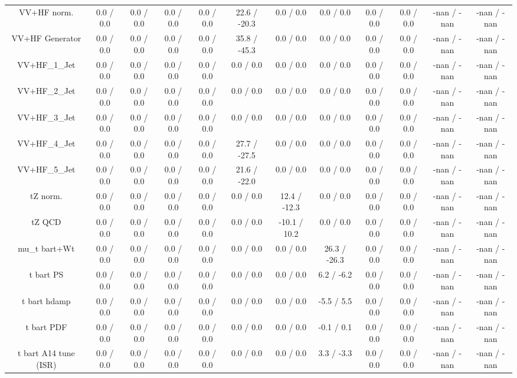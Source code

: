 \begin{table}[htbp]
\begin{center}
\begin{tabular}{|c|c|c|c|c|c|c|c|c|c|c|c|}
  VV+HF norm. & 0.0 / 0.0 & 0.0 / 0.0 & 0.0 / 0.0 & 0.0 / 0.0 & 22.6 / -20.3 & 0.0 / 0.0 & 0.0 / 0.0 & 0.0 / 0.0 & 0.0 / 0.0 & -nan / -nan & -nan / -nan \\ 
  VV+HF Generator & 0.0 / 0.0 & 0.0 / 0.0 & 0.0 / 0.0 & 0.0 / 0.0 & 35.8 / -45.3 & 0.0 / 0.0 & 0.0 / 0.0 & 0.0 / 0.0 & 0.0 / 0.0 & -nan / -nan & -nan / -nan \\ 
  VV+HF_1_Jet & 0.0 / 0.0 & 0.0 / 0.0 & 0.0 / 0.0 & 0.0 / 0.0 & 0.0 / 0.0 & 0.0 / 0.0 & 0.0 / 0.0 & 0.0 / 0.0 & 0.0 / 0.0 & -nan / -nan & -nan / -nan \\ 
  VV+HF_2_Jet & 0.0 / 0.0 & 0.0 / 0.0 & 0.0 / 0.0 & 0.0 / 0.0 & 0.0 / 0.0 & 0.0 / 0.0 & 0.0 / 0.0 & 0.0 / 0.0 & 0.0 / 0.0 & -nan / -nan & -nan / -nan \\ 
  VV+HF_3_Jet & 0.0 / 0.0 & 0.0 / 0.0 & 0.0 / 0.0 & 0.0 / 0.0 & 0.0 / 0.0 & 0.0 / 0.0 & 0.0 / 0.0 & 0.0 / 0.0 & 0.0 / 0.0 & -nan / -nan & -nan / -nan \\ 
  VV+HF_4_Jet & 0.0 / 0.0 & 0.0 / 0.0 & 0.0 / 0.0 & 0.0 / 0.0 & 27.7 / -27.5 & 0.0 / 0.0 & 0.0 / 0.0 & 0.0 / 0.0 & 0.0 / 0.0 & -nan / -nan & -nan / -nan \\ 
  VV+HF_5_Jet & 0.0 / 0.0 & 0.0 / 0.0 & 0.0 / 0.0 & 0.0 / 0.0 & 21.6 / -22.0 & 0.0 / 0.0 & 0.0 / 0.0 & 0.0 / 0.0 & 0.0 / 0.0 & -nan / -nan & -nan / -nan \\ 
  tZ norm. & 0.0 / 0.0 & 0.0 / 0.0 & 0.0 / 0.0 & 0.0 / 0.0 & 0.0 / 0.0 & 12.4 / -12.3 & 0.0 / 0.0 & 0.0 / 0.0 & 0.0 / 0.0 & -nan / -nan & -nan / -nan \\ 
  tZ QCD & 0.0 / 0.0 & 0.0 / 0.0 & 0.0 / 0.0 & 0.0 / 0.0 & 0.0 / 0.0 & -10.1 / 10.2 & 0.0 / 0.0 & 0.0 / 0.0 & 0.0 / 0.0 & -nan / -nan & -nan / -nan \\ 
   mu_{t bar{t}+Wt} & 0.0 / 0.0 & 0.0 / 0.0 & 0.0 / 0.0 & 0.0 / 0.0 & 0.0 / 0.0 & 0.0 / 0.0 & 26.3 / -26.3 & 0.0 / 0.0 & 0.0 / 0.0 & -nan / -nan & -nan / -nan \\ 
  t bar{t} PS & 0.0 / 0.0 & 0.0 / 0.0 & 0.0 / 0.0 & 0.0 / 0.0 & 0.0 / 0.0 & 0.0 / 0.0 & 6.2 / -6.2 & 0.0 / 0.0 & 0.0 / 0.0 & -nan / -nan & -nan / -nan \\ 
  t bar{t} hdamp & 0.0 / 0.0 & 0.0 / 0.0 & 0.0 / 0.0 & 0.0 / 0.0 & 0.0 / 0.0 & 0.0 / 0.0 & -5.5 / 5.5 & 0.0 / 0.0 & 0.0 / 0.0 & -nan / -nan & -nan / -nan \\ 
  t bar{t} PDF & 0.0 / 0.0 & 0.0 / 0.0 & 0.0 / 0.0 & 0.0 / 0.0 & 0.0 / 0.0 & 0.0 / 0.0 & -0.1 / 0.1 & 0.0 / 0.0 & 0.0 / 0.0 & -nan / -nan & -nan / -nan \\ 
  t bar{t} A14 tune (ISR) & 0.0 / 0.0 & 0.0 / 0.0 & 0.0 / 0.0 & 0.0 / 0.0 & 0.0 / 0.0 & 0.0 / 0.0 & 3.3 / -3.3 & 0.0 / 0.0 & 0.0 / 0.0 & -nan / -nan & -nan / -nan \\ 

\end{tabular}
\end{center}
\end{table}
